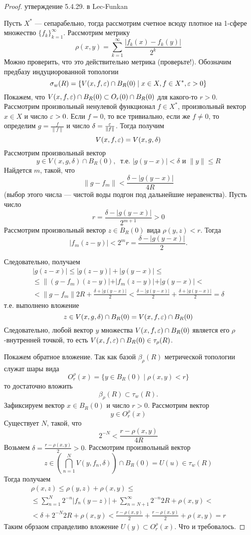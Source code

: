 \begin{proof}
	утверждение 5.4.29. в Lec-Funkan 
	
	
	Пусть $X^*$ --- сепарабельно, тогда рассмотрим счетное всюду плотное на 1-сфере множество $\{f_k\}_{k=1}^\infty$. Рассмотрим метрику 
	$$
	\rho(x,y) = \sum_{k=1}^{\infty} \frac{|f_k(x) - f_k(y)|}{2^k}
	$$
	Можно проверить, что это действительно метрика (проверьте!). Обозначим предбазу индуциорованной топологии 
	$$
	\sigma_w(R) = \{V(x,f,\varepsilon)  \cap B_R(0) \mid x \in X, f \in X^*, \varepsilon > 0\}
	$$
	Покажем, что $V(x,f,\varepsilon) \cap B_R(0) \subset O_r(0) \cap B_R(0)$ для какого-то $r > 0$. Рассмотрим произвольный ненулевой функционал $f \in X^*$, произвольный вектор $x \in X$ и число $\varepsilon > 0$. Если $f = 0$, то все тривиально, если же $f \neq 0$, то определим $g = \frac{f}{\|f\|}$ и число $\delta = \frac{\varepsilon}{\|f\|}$. Тогда получим
	$$
	V(x,f,\varepsilon) = V(x,g,\delta) 
	$$
	Рассмотрим произвольный вектор 
	$$
	y \in V(x,g,\delta) \cap B_R(0), \ \text{ т.е. } |g(y-x)| < \delta \text{ и } \|y\| \leq R
	$$
	Найдется $m$, такой, что
	$$
	\|g - f_m\| < \frac{\delta - |g(y-x)|}{4R}
	$$
	(выбор этого числа --- чистой воды подгон под дальнейшие неравенства). Пусть число 
	$$
	r = \frac{\delta - |g(y-x)|}{2^{m+1}} > 0
	$$
	Рассмотрим произвольный вектор $z \in B_R(0)$ вида $\rho(y,z) < r$. Тогда
	$$
	|f_m(z-y)| < 2^m r = \frac{\delta - |g(y-x)|}{2}.
	$$

	Следовательно, получаем 
	\begin{gather*}
	|g(z- x)| \leq |g(z - y)| + |g(y -x )| \leq \\ \leq  \|(g - f_m)(z - y)| + |f_m(z - y)| + |g(y-x)| <\\ <  \|g - f_m\| 2R + \frac{\delta + |g(y - x)|}{2} < \frac{\delta - |g(y-x)|}{2} + \frac{\delta + |g(y-x)|}{2} = \delta
	\end{gather*}
	т.е. выполнено вложение 
	$$
	z \in V(x,g,\delta) \cap B_R(0) = V(x,f,\varepsilon) \cap B_R(0)
	$$
	Следовательно, любой вектор $y$ множества $V(x,f,\varepsilon) \cap B_R(0)$ является его $\rho$-внутренней точкой, то есть $V(x,f,\varepsilon) \cap B_R(0) \in \tau_\rho(R)$.
	
	Покажем обратное вложение. Так как базой $\beta_\rho(R)$ метрической топологии служат шары вида
	$$
	O_r^\rho(x) = \{y \in B_R(0) \mid \rho(x,y) < r\}
	$$
	то достаточно вложить $$\beta_\rho(R) \subset \tau_w(R).$$ Зафиксируем вектор $x \in B_R(0)$ и число $r > 0$. Рассмотрим вектор 
	$$
	y\in O_r^\rho(x)
	$$
	Существует $N$, такой, что
	$$
	2^{-N} < \frac{r - \rho(x,y)}{4R}
	$$
	Возьмем $\delta = \frac{r - \rho(x,y)}{2} > 0$. Рассмотрим произвольный вектор  
	$$
	z \in \left(\bigcap_{n=1}^N V(y,f_n,\delta)\right) \cap B_R(0) = U(u) \in \tau_w(R)
	$$
	Тогда получаем
	\begin{gather*}
		\rho(x,z) \leq \rho(y,z) + \rho(x,y) \leq \\ \leq \sum_{n=1}^N 2^{-n} |f_n(y-z)| + \sum_{n = N+1}^\infty 2^{-n} 2R + \rho(x,y) < \\ < \delta + 2^{-N} 2R + \rho(x,y) < \frac{r - \rho(x,y)}{2} + \frac{r - \rho(x,y)}{2} + \rho(x,y) = r
	\end{gather*}
	Таким обрзаом справделиво вложение $U(y) \subset O_r^\rho(x)$. Что и требовалось.
\end{proof}
